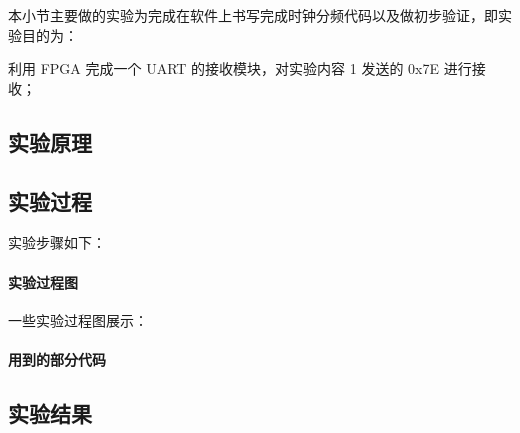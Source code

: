 

本小节主要做的实验为完成在软件上书写完成时钟分频代码以及做初步验证，即实验目的为：

利用 FPGA 完成一个 UART 的接收模块，对实验内容 1 发送的 0x7E 进行接收；

\subsection{实验原理}

\subsection{实验过程}
实验步骤如下：


\paragraph{实验过程图}
一些实验过程图展示：




\paragraph{用到的部分代码}



\subsection{实验结果}
